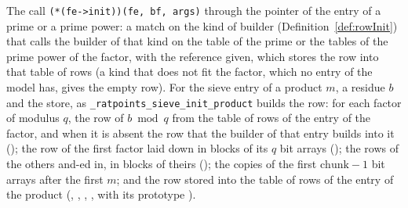 \begin{definition}\label{def:sieveInitProduct}
  \leanok
  The call \verb|(*(fe->init))(fe, bf, args)| through the pointer of the entry of a prime or a prime
  power: a match on the kind of builder (Definition~\ref{def:rowInit}) that calls the builder of
  that kind on the table of the prime or the tables of the prime power of the factor, with the
  reference given, which stores the row into that table of rows (a kind that does not fit the
  factor, which no entry of the model has, gives the empty row). For the sieve entry of a product
  $m$, a residue $b$ and the store, as \verb|_ratpoints_sieve_init_product| builds the row: for each
  factor of modulus $q$, the row of $b \bmod q$ from the table of rows of the entry of the factor,
  and when it is absent the row that the builder of that entry builds into it
  (); the row of the first factor laid down in blocks of its $q$ bit
  arrays (); the rows of the others and-ed in, in blocks of theirs
  (); the copies of the first $\mathrm{chunk} - 1$ bit arrays after the
  first $m$; and the row stored into the table of rows of the entry of the product
  (, , ,
  , with its prototype ).
\end{definition}

